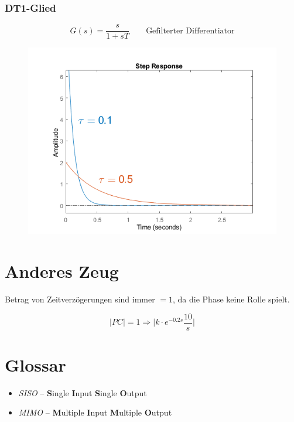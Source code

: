 \documentclass[
  10pt,
  a4paper,
  twocolumn]{article}
\providecommand{\tightlist}{%
  \setlength{\itemsep}{0pt}\setlength{\parskip}{0pt}}\usepackage{longtable,booktabs,array}
\numberwithin{equation}{section}
\begin{document}
\hypertarget{dt1-glied}{%
\subsubsection{DT1-Glied}\label{dt1-glied}}

\[
G(s)=\frac{s}{1+sT} \qquad \text{Gefilterter Differentiator}
\]

\begin{figure}[H]

{\centering \includegraphics{images/paste-24.png}

}

\end{figure}

\hypertarget{anderes-zeug}{%
\section{Anderes Zeug}\label{anderes-zeug}}

Betrag von Zeitverzögerungen sind immer \(=1\), da die Phase keine Rolle
spielt.

\[
|PC| = 1 \Rightarrow \lvert k \cdot e^{-0.2s} \frac{10}{s}\rvert
\]

\hypertarget{glossar}{%
\section{Glossar}\label{glossar}}

\begin{itemize}
\tightlist
\item
  \emph{SISO} -- \textbf{S}ingle \textbf{I}nput \textbf{S}ingle
  \textbf{O}utput
\item
  \emph{MIMO} -- \textbf{M}ultiple \textbf{I}nput \textbf{M}ultiple
  \textbf{O}utput
\end{itemize}
\end{document}
